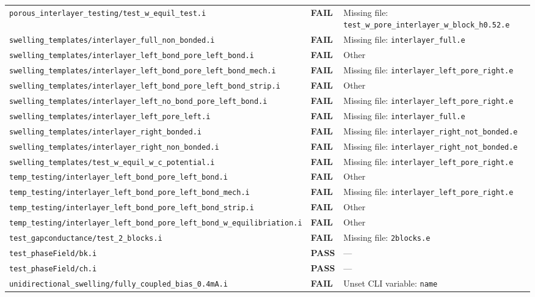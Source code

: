 \documentclass[10pt,letterpaper]{article}
\newcommand{\PASS}{\textcolor{passgreen}{\textbf{PASS}}}
\newcommand{\FAIL}{\textcolor{failred}{\textbf{FAIL}}}
\newcommand{\code}[1]{\texttt{\small #1}}
\begin{document}
\begin{longtable}{p{} l p{}}
\code{porous\_interlayer\_testing/test\_w\_equil\_test.i} & \FAIL & Missing file: \code{test\_w\_pore\_interlayer\_w\_block\_h0.52.e} \\
\code{swelling\_templates/interlayer\_full\_non\_bonded.i} & \FAIL & Missing file: \code{interlayer\_full.e} \\
\code{swelling\_templates/interlayer\_left\_bond\_pore\_left\_bond.i} & \FAIL & Other \\
\code{swelling\_templates/interlayer\_left\_bond\_pore\_left\_bond\_mech.i} & \FAIL & Missing file: \code{interlayer\_left\_pore\_right.e} \\
\code{swelling\_templates/interlayer\_left\_bond\_pore\_left\_bond\_strip.i} & \FAIL & Other \\
\code{swelling\_templates/interlayer\_left\_no\_bond\_pore\_left\_bond.i} & \FAIL & Missing file: \code{interlayer\_left\_pore\_right.e} \\
\code{swelling\_templates/interlayer\_left\_pore\_left.i} & \FAIL & Missing file: \code{interlayer\_full.e} \\
\code{swelling\_templates/interlayer\_right\_bonded.i} & \FAIL & Missing file: \code{interlayer\_right\_not\_bonded.e} \\
\code{swelling\_templates/interlayer\_right\_non\_bonded.i} & \FAIL & Missing file: \code{interlayer\_right\_not\_bonded.e} \\
\code{swelling\_templates/test\_w\_equil\_w\_c\_potential.i} & \FAIL & Missing file: \code{interlayer\_left\_pore\_right.e} \\
\code{temp\_testing/interlayer\_left\_bond\_pore\_left\_bond.i} & \FAIL & Other \\
\code{temp\_testing/interlayer\_left\_bond\_pore\_left\_bond\_mech.i} & \FAIL & Missing file: \code{interlayer\_left\_pore\_right.e} \\
\code{temp\_testing/interlayer\_left\_bond\_pore\_left\_bond\_strip.i} & \FAIL & Other \\
\code{temp\_testing/interlayer\_left\_bond\_pore\_left\_bond\_w\_equilibriation.i} & \FAIL & Other \\
\code{test\_gapconductance/test\_2\_blocks.i} & \FAIL & Missing file: \code{2blocks.e} \\
\code{test\_phaseField/bk.i} & \PASS & --- \\
\code{test\_phaseField/ch.i} & \PASS & --- \\
\code{unidirectional\_swelling/fully\_coupled\_bias\_0.4mA.i} & \FAIL & Unset CLI variable: \code{name} \\

\end{longtable}
\end{document}
